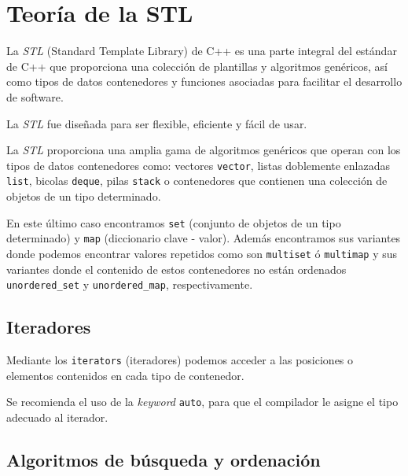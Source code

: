 \thispagestyle{empty}
\cleardoublepage
\chapter{Teoría de la STL}

La \textit{STL} (Standard Template Library) de C++ es una parte integral del estándar de C++ que proporciona una colección de plantillas y algoritmos genéricos, así como tipos de datos contenedores y funciones asociadas para facilitar el desarrollo de software.

La \textit{STL} fue diseñada para ser flexible, eficiente y fácil de usar.

La \textit{STL} proporciona una amplia gama de algoritmos genéricos que operan con los tipos de datos contenedores como: vectores \texttt{vector}, listas doblemente enlazadas \texttt{list},
bicolas \texttt{deque}, pilas \texttt{stack} o contenedores que contienen una colección de objetos de un tipo determinado.

En este último caso encontramos \texttt{set} (conjunto de objetos de un tipo determinado) y \texttt{map} (diccionario clave - valor).
Además encontramos sus variantes donde podemos encontrar valores repetidos como son \texttt{multiset} ó \texttt{multimap} y sus variantes donde el contenido de estos contenedores no están ordenados \texttt{unordered\_set} y \texttt{unordered\_map}, respectivamente.

\section{Iteradores}
Mediante los \texttt{iterators} (iteradores) podemos acceder a las posiciones o elementos contenidos en cada tipo de contenedor.

Se recomienda el uso de la \textit{keyword} \texttt{auto}, para que el compilador le asigne el tipo adecuado al iterador.
\section{Algoritmos de búsqueda y ordenación}
